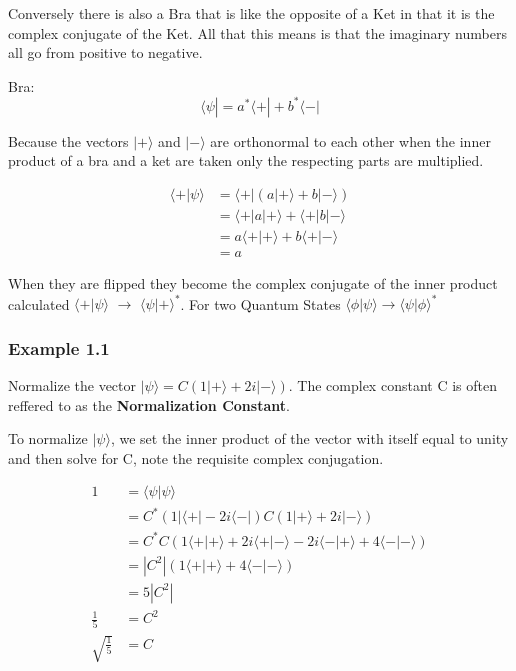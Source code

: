 \documentclass[twocolumn]{article}
\begin{document}
Conversely there is also a Bra that is like the opposite of a Ket in that it is the complex conjugate of the Ket. All that this means is that the imaginary numbers all go from positive to negative. 

Bra:
\begin{equation}\label{ket}
    \langle\psi|=a^*\langle+|+b^*\langle-|
\end{equation}

Because the vectors $|+\rangle$ and $|-\rangle$ are orthonormal to each other when the inner product of a bra and a ket are taken only the respecting parts are multiplied. 

\begin{equation} \label{eq1}
\begin{split}
\langle+|\psi\rangle & = \langle+|(a|+\rangle+b|-\rangle) \\
 & = \langle+|a|+\rangle+\langle+|b|-\rangle\\
 & = a\langle+|+\rangle+b\langle+|-\rangle\\
 & = a
\end{split}
\end{equation}

When they are flipped they become the complex conjugate of the inner product calculated $\langle+|\psi\rangle$ $\rightarrow$ $\langle\psi|+\rangle^*$. For two Quantum States $\langle\phi|\psi\rangle\rightarrow\langle\psi|\phi\rangle^*$ 

\subsubsection{Example 1.1}

Normalize the vector $|\psi\rangle=C(1|+\rangle+2i|-\rangle)$. The complex constant C is often reffered to as the \textbf{Normalization Constant}.

To normalize $|\psi\rangle$, we set the inner product of the vector with itself equal to unity and then solve for C, note the requisite complex conjugation.

\begin{equation} \label{eq2}
\begin{split}
1 & = \langle\psi|\psi\rangle \\
 & = C^*(1|\langle+|-2i\langle-|)C(1|+\rangle+2i|-\rangle)\\
 & = C^*C(1\langle+|+\rangle+2i\langle+|-\rangle-2i\langle-|+\rangle+4\langle-|-\rangle)\\
 & = |C^2|(1\langle+|+\rangle+4\langle-|-\rangle)\\
 & = 5|C^2|\\
 \frac{1}{5} & = C^2\\
 \sqrt{\frac{1}{5}} & = C
\end{split}
\end{equation}
\end{document}
